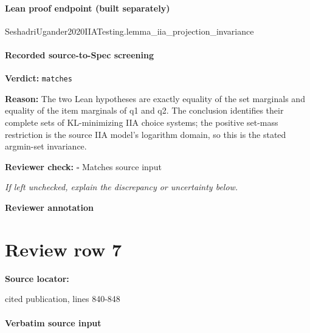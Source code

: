 \documentclass[10pt]{article}
\newcommand{\reviewerbox}{%
  \par\noindent\fbox{\parbox{0.96\linewidth}{\rule{0pt}{0.38in}}}\par
}
\newcommand{\reviewmatch}[1]{%
  \par\noindent\textbf{Reviewer check:} $\square$\; #1\par
  \noindent\emph{If left unchecked, explain the discrepancy or uncertainty below.}\par
}
\begin{document}
\paragraph{Lean proof endpoint (built separately)}\begin{ReviewVerbatim}
SeshadriUgander2020IIATesting.lemma_iia_projection_invariance
\end{ReviewVerbatim}

\paragraph{Recorded source-to-Spec screening}
\textbf{Verdict:} \texttt{matches}
\\
{\raggedright
\textbf{Reason:} The two Lean hypotheses are exactly equality of the set marginals and equality of the item marginals of q1 and q2.\allowbreak{} The conclusion identifies their complete sets of KL-\allowbreak{}minimizing IIA choice systems;\allowbreak{} the positive set-\allowbreak{}mass restriction is the source IIA model's logarithm domain, so this is the stated argmin-\allowbreak{}set invariance.\allowbreak{}
\par}
\reviewmatch{Matches source input}
\noindent\textbf{Reviewer annotation}\par
\reviewerbox
\clearpage
\hypertarget{source-claim-51e7083c7665542f}{}
\section*{Review row 7}
\textbf{Source locator:} {\footnotesize\raggedright cited publication, lines 840-\allowbreak{}848\par}
\paragraph{Verbatim source input}
\end{document}
